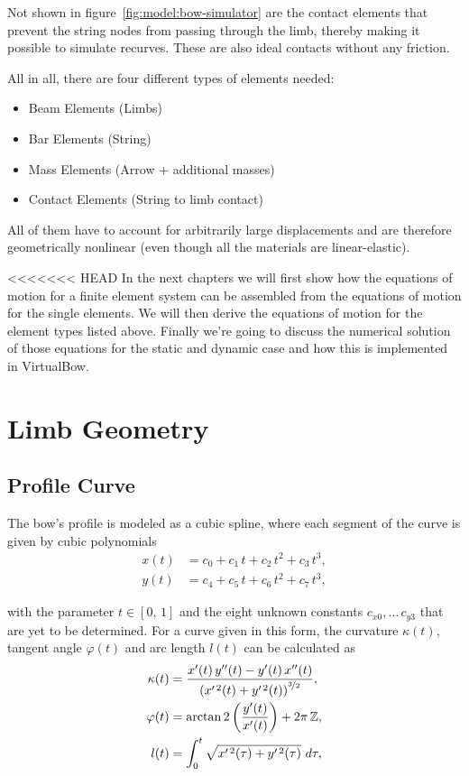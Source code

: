 Not shown in figure~\ref{fig:model:bow-simulator} are the contact elements that prevent the string nodes from passing through the limb, thereby making it possible to simulate recurves. These are also ideal contacts without any friction.

All in all, there are four different types of elements needed:

\begin{itemize}
\item Beam Elements (Limbs)
\item Bar Elements (String)
\item Mass Elements (Arrow + additional masses)
\item Contact Elements (String to limb contact)
\end{itemize}

All of them have to account for arbitrarily large displacements and are therefore geometrically nonlinear (even though all the materials are linear-elastic).

<<<<<<< HEAD
In the next chapters we will first show how the equations of motion for a finite element system can be assembled from the equations of motion for the single elements. We will then derive the equations of motion for the element types listed above. Finally we're going to discuss the numerical solution of those equations for the static and dynamic case and how this is implemented in VirtualBow.

\newpage
\section{Limb Geometry}

\subsection{Profile Curve}

The bow's profile is modeled as a cubic spline, where each segment of the curve is given by cubic polynomials
%
\begin{align}
x(t) &= c_{0} + c_{1}\,t + c_{2}\,t^2 + c_{3}\,t^3, \\
y(t) &= c_{4} + c_{5}\,t + c_{6}\,t^2 + c_{7}\,t^3,
\end{align}

with the parameter $t \in [0,\,1]$ and the eight unknown constants $c_{x0},\ldots\,c_{y3}$ that are yet to be determined.
For a curve given in this form, the curvature $\kappa(t)$, tangent angle $\varphi(t)$ and arc length $l(t)$ can be calculated as
%
\begin{align}
\kappa(t) &= \frac{x'(t)\,y''(t) - y'(t)\,x''(t)}{\left(x'^{\,2}(t) + y'^{\,2}(t)\right)^{\nicefrac{3}{2}}}, \\
\varphi(t) &= \arctan2\left(\frac{y'(t)}{x'(t)}\right) + 2\pi\,\mathbb{Z},  \\
l(t) &= \int_{0}^{t} \sqrt{x'^{\,2}(\tau) + y'^{\,2}(\tau)}\ d\tau,
\end{align}

